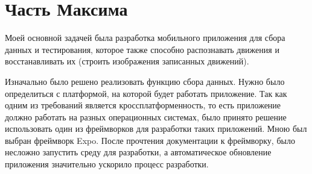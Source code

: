 \newpage
\section{Часть Максима}

Моей основной задачей была разработка мобильного приложения для сбора данных и тестирования, которое также способно распознавать движения и восстанавливать их (строить изображения записанных движений).


Изначально было решено реализовать функцию сбора данных. 
Нужно было определиться с платформой, на которой будет работать приложение. Так как одним из требований является кроссплатформенность, то есть приложение должно работать на разных операционных системах, было принято решение использовать один из фреймворков для разработки таких приложений.
Мною был выбран фреймворк Expo.
После прочтения документации к фреймворку, было несложно запустить среду для разработки, а автоматическое обновление приложения значительно ускорило процесс разработки.

